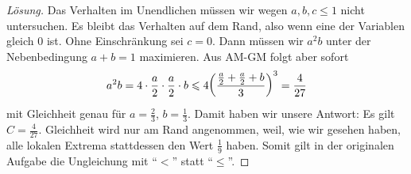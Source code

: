 \begin{proof}[Lösung]
	Das Verhalten im Unendlichen müssen wir wegen $a,b,c\leqslant 1$ nicht untersuchen. Es bleibt das Verhalten auf dem Rand, also wenn eine der Variablen gleich $0$ ist. Ohne Einschränkung sei $c=0$. Dann müssen wir $a^2b$ unter der Nebenbedingung $a+b=1$ maximieren. Aus AM-GM folgt aber sofort
	\begin{equation*}
		a^2b=4\cdot\frac{a}{2}\cdot \frac{a}{2}\cdot b\leqslant 4\parens*{\frac{\frac a2+\frac a2+b}{3}}^3=\frac{4}{27}
	\end{equation*}
	mit Gleichheit genau für $a=\frac23$, $b=\frac13$. Damit haben wir unsere Antwort: Es gilt $C=\frac{4}{27}$. Gleichheit wird nur am Rand angenommen, weil, wie wir gesehen haben, alle lokalen Extrema stattdessen den Wert $\frac19$ haben. Somit gilt in der originalen Aufgabe die Ungleichung mit \enquote{$<$} statt \enquote{$\leqslant$}.
\end{proof}

